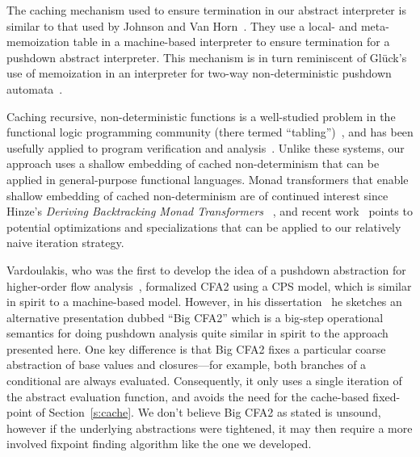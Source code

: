 The caching mechanism used to ensure termination in our abstract interpreter is
similar to that used by Johnson and Van
Horn~\cite{dvanhorn:Johnson2014Abstracting}. They use a local- and
meta-memoization table in a machine-based interpreter to ensure termination for
a pushdown abstract interpreter.  This mechanism is in turn reminiscent of
Gl\"{u}ck's use of memoization in an interpreter for two-way non-deterministic
pushdown automata~\cite{local:gluck-schmidtfest13}.

Caching recursive, non-deterministic functions is a well-studied problem in the
functional logic programming community (there termed
``tabling'')~\cite{local:tamaki1986old, local:bol1993tabulated,
  local:chen1996tabled, local:swift2012xsb}, and has been usefully applied to
program verification and analysis~\cite{local:dawson1996practical,
  local:janssens1998use}. Unlike these systems, our approach uses a shallow
embedding of cached non-determinism that can be applied in general-purpose
functional languages.
%
Monad transformers that enable shallow embedding of cached non-determinism are
of continued interest since Hinze's \emph{Deriving Backtracking Monad
  Transformers} ~\cite{local:hinze2000deriving, local:kiselyov2005backtracking,
  local:fischer2011purely}, and recent work~\cite{local:ploeg2014reflection,
  local:vandenbroucke2016fixing} points to potential optimizations and
specializations that can be applied to our relatively naive iteration strategy.

Vardoulakis, who was the first to develop the idea of a pushdown abstraction
for higher-order flow analysis~\cite{dvanhorn:Vardoulakis2011CFA2}, formalized
CFA2 using a CPS model, which is similar in spirit to a machine-based model.
However, in his dissertation~\cite{local:vardoulakis-diss12} he sketches an
alternative presentation dubbed ``Big CFA2'' which is a big-step operational
semantics for doing pushdown analysis quite similar in spirit to the approach
presented here.  One key difference is that Big CFA2 fixes a particular coarse
abstraction of base values and closures---for example, both branches of a
conditional are always evaluated.  Consequently, it only uses a single
iteration of the abstract evaluation function, and avoids the need for the
cache-based fixed-point of Section~\ref{s:cache}.  We don't believe Big CFA2 as
stated is unsound, however if the underlying abstractions were tightened, it
may then require a more involved fixpoint finding algorithm like the one we
developed.


